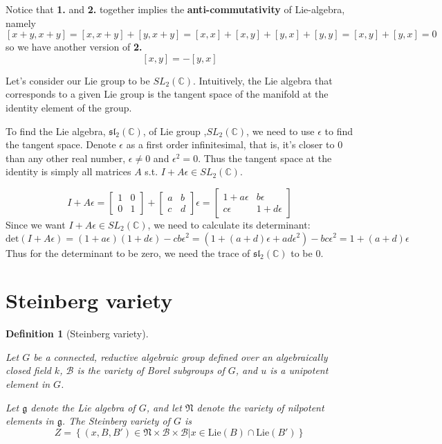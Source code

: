 \documentclass[a4paper]{article}
\newcommand{\C}{\mathbb{C}}
\newtheorem{definition}{Definition}[section]
\begin{document}
Notice that  \textbf{1.} and  \textbf{2.} together implies the \textbf{anti-commutativity} of Lie-algebra, namely \[
	[x+y, x+y] = [x, x+y] + [y, x+y] = [x,x]+[x,y] + [y,x]+[y,y] = [x,y] + [y,x] = 0
\]  so we have another version of \textbf{2.} \[
[x,y] = -[y,x]
\]  

\bigskip

Let's consider our Lie group to be $SL_2(\C)$. Intuitively, the Lie algebra that corresponds to a given Lie group is the tangent space of the manifold at the identity element of the group.

To find the Lie algebra, $\mathfrak{sl}_2(\C)$, of Lie group ,$SL_2(\C)$, we need to use  $\epsilon$ to find the tangent space. Denote $\epsilon$ as a first order infinitesimal, that is, it's closer to  $0$ than any other real number, $\epsilon \neq 0$ and $\epsilon^2 = 0$. Thus the tangent space at the identity is simply all matrices $A$ s.t.  $I+A\epsilon \in SL_2(\C)$.

\[
	I + A \epsilon = \begin{bmatrix} 1 & 0 \\ 0 & 1 \end{bmatrix} + \begin{bmatrix} a & b \\ c & d \end{bmatrix} \epsilon = \begin{bmatrix} 1+a \epsilon & b \epsilon \\ c \epsilon & 1+d \epsilon \end{bmatrix}  
\]
Since we want $I + A \epsilon \in SL_2(\C)$, we need to calculate its determinant: \[
	\text{det}(I + A \epsilon) = (1+a \epsilon)(1+d\epsilon) - c b \epsilon ^2 = (1 + (a+d)\epsilon + a d \epsilon^2) - b c \epsilon^2 = 1 + (a+d) \epsilon 
\]
Thus for the determinant to be zero, we need the trace of $\mathfrak{sl}_2(\C)$ to be  $0$.


\section{Steinberg variety}
\begin{definition}[Steinberg variety]
\citep{douglass_steinberg_2008}

	Let $G$ be a connected, reductive algebraic group defined over an algebraically closed field  $k$,  $\mathcal{B}$ is the variety of Borel subgroups of  $G$, and  $u$ is a unipotent element in  $G$. 

	Let  $\mathfrak{g}$ denote the Lie algebra of  $G$, and let  $\mathfrak{N}$ denote the variety of nilpotent elements in  $\mathfrak{g}$. The Steinberg variety of  $G$ is  \[
		Z = \left\{ \left( x, B, B' \right) \in  \mathfrak{N} \times \mathcal{B} \times \mathcal{B} | x \in \text{Lie}\left( B \right) \cap \text{Lie}\left( B' \right)   \right\} 
	\] 
	
\end{definition}
\end{document}
